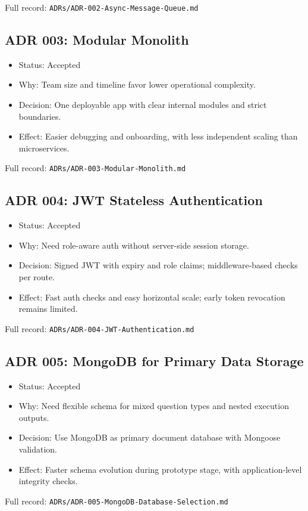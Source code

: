 \documentclass[12pt,journal,onecolumn]{IEEEtran}
\begin{document}
Full record: \texttt{ADRs/ADR-002-Async-Message-Queue.md}

\subsection{ADR 003: Modular Monolith}
\begin{itemize}
    \item Status: Accepted
    \item Why: Team size and timeline favor lower operational complexity.
    \item Decision: One deployable app with clear internal modules and strict boundaries.
    \item Effect: Easier debugging and onboarding, with less independent scaling than microservices.
\end{itemize}

Full record: \texttt{ADRs/ADR-003-Modular-Monolith.md}

\subsection{ADR 004: JWT Stateless Authentication}
\begin{itemize}
    \item Status: Accepted
    \item Why: Need role-aware auth without server-side session storage.
    \item Decision: Signed JWT with expiry and role claims; middleware-based checks per route.
    \item Effect: Fast auth checks and easy horizontal scale; early token revocation remains limited.
\end{itemize}

Full record: \texttt{ADRs/ADR-004-JWT-Authentication.md}

\subsection{ADR 005: MongoDB for Primary Data Storage}
\begin{itemize}
    \item Status: Accepted
    \item Why: Need flexible schema for mixed question types and nested execution outputs.
    \item Decision: Use MongoDB as primary document database with Mongoose validation.
    \item Effect: Faster schema evolution during prototype stage, with application-level integrity checks.
\end{itemize}

Full record: \texttt{ADRs/ADR-005-MongoDB-Database-Selection.md}
\end{document}
